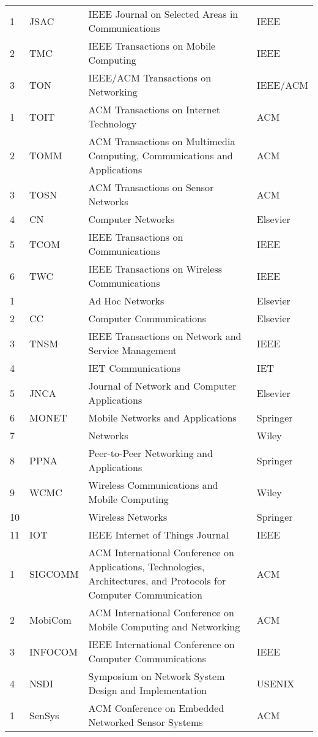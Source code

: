 \documentclass[print, doctor, vlined]{DissertUESTC}
\begin{document}
\begin{longtable}{p{2em} p{4.5em} p{20em} p{6em}}
		1 & JSAC & IEEE Journal on Selected Areas in Communications & IEEE \\
		2 & TMC & IEEE Transactions on Mobile Computing & IEEE \\
		3 & TON & IEEE/ACM Transactions on Networking & IEEE/ACM \\
		1 & TOIT & ACM Transactions on Internet Technology & ACM \\
		2 & TOMM & ACM Transactions on Multimedia Computing, Communications and Applications & ACM \\
		3 & TOSN & ACM Transactions on Sensor Networks & ACM \\
		4 & CN & Computer Networks & Elsevier \\
		5 & TCOM & IEEE Transactions on Communications & IEEE \\
		6 & TWC & IEEE Transactions on Wireless Communications & IEEE \\
		1 & & Ad Hoc Networks & Elsevier \\
		2 & CC & Computer Communications & Elsevier \\
		3 & TNSM & IEEE Transactions on Network and Service Management & IEEE \\
		4 & & IET Communications & IET \\
		5 & JNCA & Journal of Network and Computer Applications & Elsevier \\
		6 & MONET & Mobile Networks and Applications & Springer \\
		7 & & Networks & Wiley \\
		8 & PPNA & Peer-to-Peer Networking and Applications & Springer \\
		9 & WCMC & Wireless Communications and Mobile Computing & Wiley \\
		10 & & Wireless Networks & Springer \\
		11 & IOT & IEEE Internet of Things Journal & IEEE \\
		1 & SIGCOMM & ACM International Conference on Applications, Technologies, Architectures, and Protocols for Computer Communication & ACM \\
		2 & MobiCom & ACM International Conference on Mobile Computing and Networking & ACM \\
		3 & INFOCOM & IEEE International Conference on Computer Communications & IEEE \\
		4 & NSDI & Symposium on Network System Design and Implementation & USENIX \\
		1 & SenSys & ACM Conference on Embedded Networked Sensor Systems & ACM \\

\end{longtable}
\end{document}
